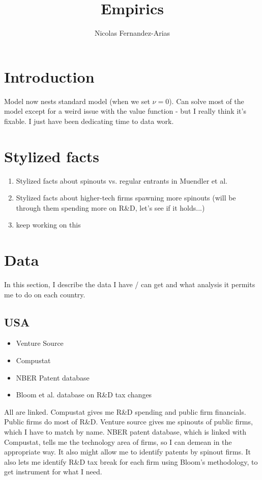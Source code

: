 \documentclass[12pt,english]{article}
\theoremstyle{remark}
\begin{document}
\title{Empirics}
\author{Nicolas Fernandez-Arias}
\maketitle

\section{Introduction}
Model now nests standard model (when we set $\nu = 0$). Can solve most of the model except for a weird issue with the value function - but I really think it's fixable. I just have been dedicating time to data work. 

\section{Stylized facts}
\begin{enumerate}
	\item Stylized facts about spinouts vs. regular entrants in Muendler et al.
	\item Stylized facts about higher-tech firms spawning more spinouts (will be through them spending more on R\&D, let's see if it holds...)
	\item keep working on this
\end{enumerate}

\section{Data}
In this section, I describe the data I have / can get and what analysis it permits me to do on each country. 


\subsection{USA}
\begin{itemize}
	\item Venture Source
	\item Compustat
	\item NBER Patent database
	\item Bloom et al. database on R\&D tax changes
\end{itemize}



All are linked. Compustat gives me R\&D spending and public firm financials. Public firms do most of R\&D. Venture source gives me spinouts of public firms, which I have to match by name. NBER patent database, which is linked with Compustat, tells me the technology area of firms, so I can demean in the appropriate way. It also might allow me to identify patents by spinout firms. It also lets me identify R\&D tax break for each firm using Bloom's methodology, to get instrument for what I need. 
\end{document}
